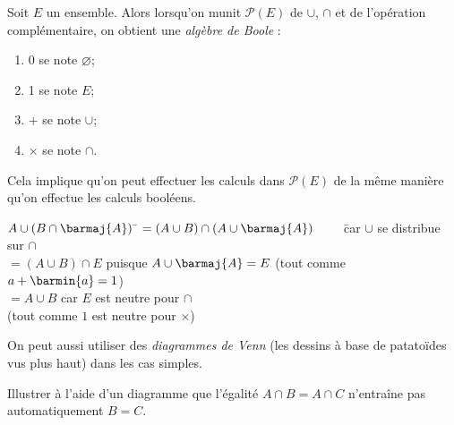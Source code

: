 \documentclass[a4paper,12pt,french]{book}
\let\emptyset\varnothing
\begin{document}
\begin{propriete}[]
Soit $E$ un ensemble. Alors lorsqu'on munit $\mathcal{P}(E)$ de $\cup$, $\cap$ et de l'opération \og complémentaire\fg{}, on obtient une \textit{algèbre de Boole} :\begin{enumerate}[\textbullet]
	\item 	0 se note $\emptyset$;
	\item 	1 se note $E$;
	\item 	+ se note $\cup$;
	\item 	$\times$ se note $\cap$.
\end{enumerate}
\end{propriete}
Cela implique qu'on peut effectuer les calculs dans $\mathcal{P}(E)$ de la même manière qu'on effectue les calculs booléens.
\begin{exemple}[]
\begin{tabbing}
$A\cup(B\cap \barmaj{A})$ \= $=(A\cup B)\cap(A\cup \barmaj{A})\qquad$ \=car $\cup$ se distribue sur $\cap$\\
						\> $= (A\cup B)\cap E$ \>puisque $A\cup \barmaj{A}=E$ (tout comme $a+\barmin{a}=1$)\\
						\> $= A\cup B$ \> car $E$ est neutre pour $\cap$ \\
						\> \>(tout comme $1$ est neutre pour $\times$)
\end{tabbing}
\end{exemple}

On peut aussi utiliser des \textit{diagrammes de Venn} (les dessins \og à base de patatoïdes\fg{} vus plus haut) dans les cas simples.

\begin{exercice}[]
Illustrer à l'aide d'un diagramme  que l'égalité $A\cap B = A\cap C$ n'entraîne pas automatiquement $B=C$.
\end{exercice}
\end{document}
